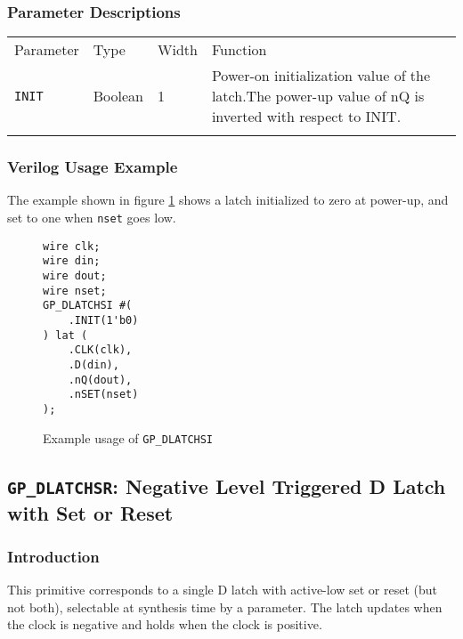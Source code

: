 \documentclass[11pt]{article}
\newcommand{\tokenstyle}[1]{\texttt{#1}}
\newcommand{\wirestyle}[1]{\texttt{#1}}
\newcommand{\whenstyle}[1]{{\fontseries{sb}\selectfont#1}}
\newcommand{\thinhline}{\Xhline{1\arrayrulewidth}}
\newcommand{\thickhline}{\Xhline{2.5\arrayrulewidth}}
\begin{document}
\subsubsection{Parameter Descriptions}

\begin{tabularx}{\textwidth}{lllX}
\thinhline
\whenstyle{Parameter} & \whenstyle{Type} & \whenstyle{Width} & \whenstyle{Function} \\
\thickhline
\tokenstyle{INIT} & Boolean & 1 & Power-on initialization value of the latch.\newline The power-up value of nQ is
inverted with respect to INIT.\\
\thinhline
\end{tabularx}

\subsubsection{Verilog Usage Example}

The example shown in figure \ref{gp-dlatchsi-example} shows a latch initialized to zero at power-up, and set to one
when \wirestyle{nset} goes low.

\begin{figure}[h]
\begin{lstlisting}
wire clk;
wire din;
wire dout;
wire nset;
GP_DLATCHSI #(
	.INIT(1'b0)
) lat (
	.CLK(clk),
	.D(din),
	.nQ(dout),
	.nSET(nset)
);
\end{lstlisting}
\caption{Example usage of \tokenstyle{GP\_DLATCHSI}}
\label{gp-dlatchsi-example}
\end{figure}


\pagebreak
\subsection{\tokenstyle{GP\_DLATCHSR}: Negative Level Triggered D Latch with Set or Reset}
\label{gp-latchsr}

\subsubsection{Introduction}
This primitive corresponds to a single D latch with active-low set or reset (but not both), selectable at synthesis time by 
a parameter. The latch updates when the clock is negative and holds when the clock is positive.
\end{document}
